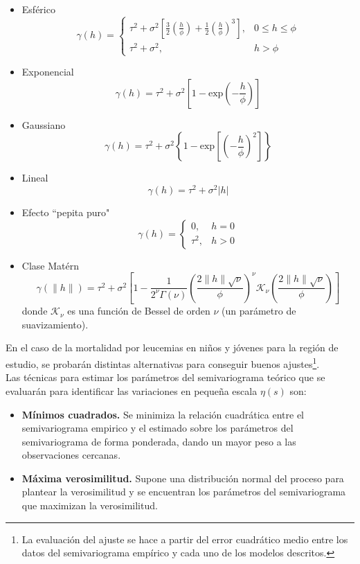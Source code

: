\documentclass[11pt, oneside]{book}
\begin{document}
\begin{itemize}
  
  \item Esférico 
   $$
   \gamma(h) = 
   \begin{cases} 
      \tau^2 + \sigma^2 \left[\frac{3}{2}\left(\frac{h}{\phi}\right)+\frac{1}{2}\left(\frac{h}{\phi}\right)^3\right], & 0\le h \le \phi \\
      \tau^2 + \sigma^2, & h>\phi
   \end{cases}
   $$
  
  \item Exponencial
   $$
   \gamma(h) = \tau^2 + \sigma^2 \left[1-\textrm{exp}\left(-\frac{h}{\phi}\right)\right]
   $$
  
  \item Gaussiano
   $$
   \gamma(h) = \tau^2 + \sigma^2 \left\{ 1-\textrm{exp} \left[ \left( -\frac{h}{\phi} \right)^2 \right] \right\}
   $$
  \item Lineal
   $$
   \gamma(h) = \tau^2 + \sigma^2 |h|
   $$
  \item Efecto ``pepita puro"
   $$
   \gamma(h) = 
   \begin{cases} 
      0, & h=0 \\
      \tau^2, & h>0 
   \end{cases}
   $$
  \item Clase Matérn
   $$
   \gamma(\|h\|) = \tau^2 + \sigma^2 \left[
                            1-\frac{1}{2^{\nu}\Gamma(\nu)}
                            \left(\frac{2\|h\|\sqrt{\nu}}{\phi}\right)^{\nu}
                            \mathcal{K}_{\nu}
                            \left(\frac{2\|h\|\sqrt{\nu}}{\phi}\right)
                            \right]
   $$
   donde $\mathcal{K}_{\nu}$ es una función de Bessel de orden $\nu$ (un parámetro de suavizamiento).
\end{itemize}

\bigskip

En el caso de la mortalidad por leucemias en niños y jóvenes para la región de estudio, se probarán distintas alternativas para conseguir buenos ajustes\footnote{La evaluación del ajuste se hace a partir del error cuadrático medio entre los datos del semivariograma empírico y cada uno de los modelos descritos.}.\\ 

Las técnicas para estimar los parámetros del semivariograma teórico que se evaluarán para identificar las variaciones en pequeña escala $\eta(s)$ son:

\begin{itemize}
  \item \textbf{Mínimos cuadrados.} Se minimiza la relación cuadrática entre el semivariograma empirico y el estimado sobre los parámetros del semivariograma de forma ponderada, dando un mayor peso a las observaciones cercanas. 
  \item \textbf{Máxima verosimilitud.} Supone una distribución normal del proceso para plantear la verosimilitud y se encuentran los parámetros del semivariograma que maximizan la verosimilitud.
\end{itemize}
\end{document}
